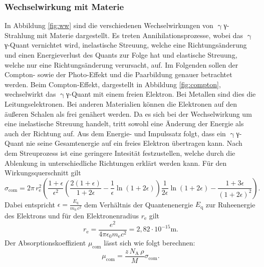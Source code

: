 \subsubsection{Wechselwirkung mit Materie}
In Abbildung \ref{fig:ww} sind die verschiedenen Wechselwirkungen von $\upgamma${γ}-Strahlung mit Materie dargestellt. Es treten Annihilationsprozesse, wobei das $\upgamma${γ}-Quant vernichtet wird, inelastische Streuung, welche eine Richtungsänderung und einen Energieverlust des Quants zur Folge hat und elastische Streuung, welche nur eine Richtungsänderung verursacht, auf.
Im Folgenden sollen der Compton- sowie der Photo-Effekt und die Paarbildung genauer betrachtet werden.
Beim Compton-Effekt, dargestellt in Abbildung \ref{fig:compton}, wechselwirkt das $\upgamma${γ}-Quant mit einem freien Elektron. Bei Metallen sind dies die Leitungselektronen. Bei anderen Materialien können die Elektronen auf den äußeren Schalen als frei genähert werden. Da es sich bei der Wechselwirkung um eine inelastische Streuung handelt, tritt sowohl eine Änderung der Energie als auch der Richtung auf. Aus dem Energie- und Impulssatz folgt, dass ein $\upgamma${γ}-Quant nie seine Gesamtenergie auf ein freies Elektron übertragen kann. Nach dem Streuprozess ist eine geringere Intesität festzustellen, welche durch die Ablenkung in unterschiedliche Richtungen erklärt werden kann. Für den Wirkungsquerschnitt gilt
\begin{equation}
\label{eqn:sigma_com}
\sigma_\mathrm{com}=2\pi\,r_\mathrm{e}^2\left(\frac{1+\epsilon}{\epsilon^2}\left(\frac{2(1+\epsilon)}{1+2\epsilon}-\frac{1}{\epsilon}\ln(1+2\epsilon) \right)\frac{1}{2\epsilon}\ln(1+2\epsilon)-\frac{1+3\epsilon}{(1+2\epsilon)^2}\right).
\end{equation}
Dabei entspricht $\epsilon = \frac{E_\mathrm{q}}{m_0\,c^2}$ dem Verhältnis der Quantenenergie $E_\mathrm{q}$ zur Ruheenergie des Elektrons und für den Elektronenradius $r_\mathrm{e}$ gilt
\begin{equation}
\label{eqn:r_e}
 r_\mathrm{e}=\frac{e^2}{4\pi\epsilon_0 m_\mathrm{e}c^2}=2,82\cdot10^{-15}\si{\meter}.
\end{equation}
Der Absorptionskoeffizient $\mu_\mathrm{com}$ lässt sich wie folgt berechnen:
\begin{equation}
  \label{eqn:mu_com}
\mu_\mathrm{com}=\frac{z\,N_\mathrm{A}\,\rho}{M}\sigma_\mathrm{com}.
\end{equation}


